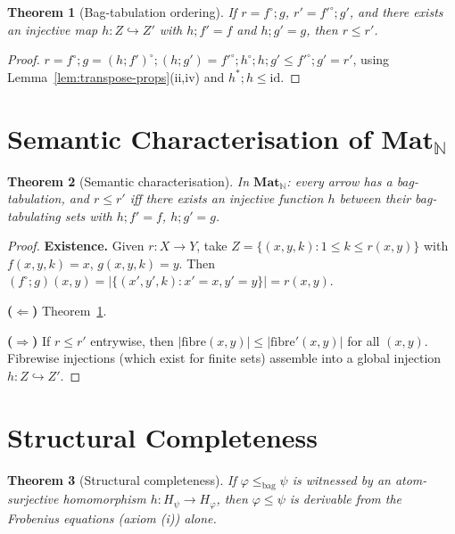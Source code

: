\documentclass[11pt,a4paper]{article}
\newtheorem{theorem}{Theorem}[section]
\theoremstyle{definition}
\newcommand{\op}{{\circ}}
\newcommand{\Mat}{\mathbf{Mat}}
\newcommand{\N}{\mathbb{N}}
\newcommand{\id}{\mathrm{id}}
\begin{document}
\begin{theorem}[Bag-tabulation ordering]\label{thm:bag-tab-order}
If $r = f^\op;g$, $r' = f'^\op;g'$, and there exists an injective map $h \colon Z \hookrightarrow Z'$ with $h;f' = f$ and $h;g' = g$, then $r \leq r'$.
\end{theorem}

\begin{proof}
$r = f^\op;g = (h;f')^\op;(h;g') = f'^\op;h^\op;h;g' \leq f'^\op;g' = r'$, using Lemma~\ref{lem:transpose-props}(ii,iv) and $h^*;h \leq \id$.
\end{proof}

\section{Semantic Characterisation of $\Mat_\N$}
\label{sec:characterisation}

\begin{theorem}[Semantic characterisation]\label{thm:characterisation}
In $\Mat_\N$: every arrow has a bag-tabulation, and $r \leq r'$ iff there exists an injective function $h$ between their bag-tabulating sets with $h;f' = f$, $h;g' = g$.
\end{theorem}

\begin{proof}
\textbf{Existence.} Given $r \colon X \to Y$, take $Z = \{(x,y,k) : 1 \leq k \leq r(x,y)\}$ with $f(x,y,k) = x$, $g(x,y,k) = y$. Then $(f^\op;g)(x,y) = |\{(x',y',k) : x' = x, y' = y\}| = r(x,y)$.

\medskip\noindent\textbf{($\Leftarrow$)} Theorem~\ref{thm:bag-tab-order}.

\medskip\noindent\textbf{($\Rightarrow$)} If $r \leq r'$ entrywise, then $|\mathrm{fibre}(x,y)| \leq |\mathrm{fibre}'(x,y)|$ for all $(x,y)$. Fibrewise injections (which exist for finite sets) assemble into a global injection $h \colon Z \hookrightarrow Z'$.
\end{proof}

\section{Structural Completeness}
\label{sec:structural}

\begin{theorem}[Structural completeness]\label{thm:structural-complete}
If $\varphi \leq_{\mathrm{bag}} \psi$ is witnessed by an atom-surjective homomorphism $h \colon H_\psi \to H_\varphi$, then $\varphi \leq \psi$ is derivable from the Frobenius equations \textup{(axiom (i))} alone.
\end{theorem}
\end{document}
